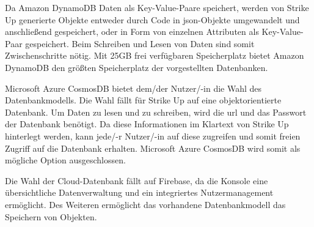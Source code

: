 Da Amazon DynamoDB Daten als Key-Value-Paare speichert, werden von Strike Up generierte Objekte entweder durch Code in \gls{json}-Objekte umgewandelt und anschließend gespeichert, oder
in Form von einzelnen Attributen als Key-Value-Paar gespeichert. Beim Schreiben und Lesen von Daten sind somit Zwischenschritte nötig. \newline
Mit 25GB frei verfügbaren Speicherplatz bietet Amazon DynamoDB den größten Speicherplatz der vorgestellten Datenbanken.

Microsoft Azure CosmosDB bietet dem/der Nutzer/-in die Wahl des Datenbankmodells. Die Wahl fällt für Strike Up auf eine objektorientierte Datenbank. \newline
Um Daten zu lesen und zu schreiben, wird die \acrshort{url} und das Passwort der Datenbank benötigt. Da diese Informationen im Klartext von Strike Up hinterlegt werden, kann jede/-r
Nutzer/-in auf diese zugreifen und somit freien Zugriff auf die Datenbank erhalten. \newline
Microsoft Azure CosmosDB wird somit als mögliche Option ausgeschlossen.

Die Wahl der Cloud-Datenbank fällt auf Firebase, da die Konsole eine übersichtliche Datenverwaltung und ein integriertes Nutzermanagement ermöglicht. Des Weiteren ermöglicht das vorhandene
Datenbankmodell das Speichern von Objekten.